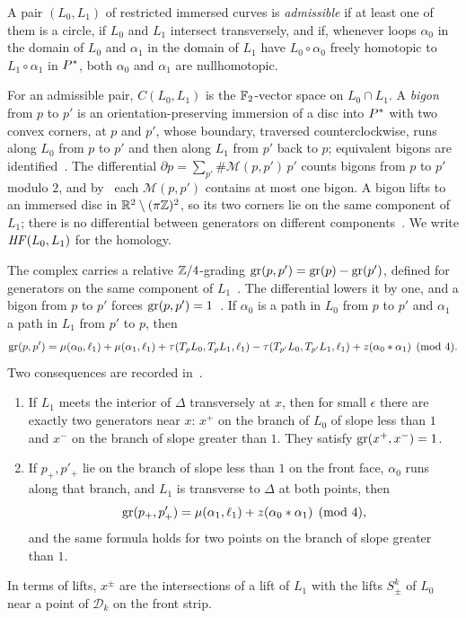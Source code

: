 \begin{definition}\label{def:admissible}
A pair $(L_0,L_1)$ of restricted immersed curves is \emph{admissible} if at least one of them is a circle, if $L_0$
and $L_1$ intersect transversely, and if, whenever loops $\alpha_0$ in the domain of $L_0$ and $\alpha_1$ in the
domain of $L_1$ have $L_0\circ\alpha_0$ freely homotopic to $L_1\circ\alpha_1$ in $P^{*}$, both $\alpha_0$ and
$\alpha_1$ are nullhomotopic.
\end{definition}

For an admissible pair, $C(L_0,L_1)$ is the $\mathbb{F}_2$-vector space on $L_0\cap L_1$. A \emph{bigon} from $p$ to $p'$ is
an orientation-preserving immersion of a disc into $P^{*}$ with two convex corners, at $p$ and $p'$, whose
boundary, traversed counterclockwise, runs along $L_0$ from $p$ to $p'$ and then along $L_1$ from $p'$ back to $p$;
equivalent bigons are identified~\cite[Def.~2.10, (5)]{HHK2}. The differential $\partial p=\sum_{p'}\#\mathcal
M(p,p')\,p'$ counts bigons from $p$ to $p'$ modulo $2$, and by~\cite[Cor.~3.13]{HHK2} each $\mathcal M(p,p')$ contains
at most one bigon. A bigon lifts to an immersed disc in $\mathbb{R}^2\setminus(\pi\mathbb{Z})^2$, so its two corners lie on the
same component of $L_1$; there is no differential between generators on different
components~\cite[p.~37]{HHK2}. We write $\mathit{HF}(L_0,L_1)$ for the homology.

The complex carries a relative $\mathbb{Z}/4$-grading $\operatorname{gr}(p,p')=\operatorname{gr}(p)-\operatorname{gr}(p')$, defined for generators on the same
component of $L_1$~\cite[Def.~3.7]{HHK2}. The differential lowers it by one, and a bigon from $p$ to $p'$ forces
$\operatorname{gr}(p,p')=1$~\cite[Prop.~3.8]{HHK2}. If $\alpha_0$ is a path in $L_0$ from $p$ to $p'$ and $\alpha_1$ a path in $L_1$
from $p'$ to $p$, then~\cite[Lemma~3.10]{HHK2}
\begin{equation}\label{eq:grading15}
\operatorname{gr}(p,p')=\mu(\alpha_0,\ell_1)+\mu(\alpha_1,\ell_1)+\tau(T_pL_0,T_pL_1,\ell_1)-\tau(T_{p'}L_0,T_{p'}L_1,\ell_1)
+z(\alpha_0*\alpha_1)\pmod4 .
\end{equation}
Two consequences are recorded in~\cite[\S\S5.1--5.2]{HHK2}.
\begin{enumerate}
\item If $L_1$ meets the interior of $\Delta$ transversely at $x$, then for small $\epsilon$ there are exactly two
generators near $x$: $x^+$ on the branch of $L_0$ of slope less than $1$ and $x^-$ on the branch of slope greater
than $1$. They satisfy $\operatorname{gr}(x^+,x^-)=1$.
\item If $p_+,p'_+$ lie on the branch of slope less than $1$ on the front face, $\alpha_0$ runs along that branch, and
$L_1$ is transverse to $\Delta$ at both points, then
\begin{equation}\label{eq:grading16}
\operatorname{gr}(p_+,p'_+)=\mu(\alpha_1,\ell_1)+z(\alpha_0*\alpha_1)\pmod4 ,
\end{equation}
and the same formula holds for two points on the branch of slope greater than $1$.
\end{enumerate}
In terms of lifts, $x^\pm$ are the intersections of a lift of $L_1$ with the lifts $S^k_\pm$ of $L_0$ near a point of
$\mathcal D_k$ on the front strip.

